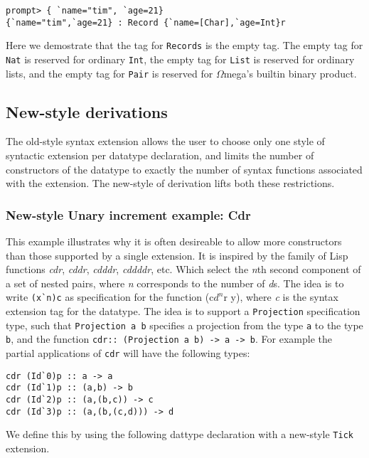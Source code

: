 \documentclass[11pt,twoside]{article}
\newcommand{\om}{$\Omega$mega}
\begin{document}
\begin{verbatim}
prompt> { `name="tim", `age=21}
{`name="tim",`age=21} : Record {`name=[Char],`age=Int}r
\end{verbatim} 

Here we demostrate that the tag for {\tt Records} is the empty tag.
The empty tag for {\tt Nat} is reserved for ordinary {\tt Int},
the empty tag for {\tt List} is reserved for ordinary lists,
and the empty tag for {\tt Pair} is reserved for \om's builtin binary
product.

\subsection{New-style derivations}

The old-style syntax extension allows the user to choose only one style of syntactic extension
per datatype declaration, and limits the number of constructors of the datatype to exactly the number
of syntax functions associated with the extension. The new-style of derivation lifts both these restrictions.

\subsubsection{New-style Unary increment example: Cdr}

This example illustrates why it is often desireable to allow more constructors than those supported by a
single extension. It is inspired by the family of Lisp functions {\it cdr}, {\it cddr}, {\it cdddr}, {\it
cddddr}, etc. Which select the {\it n}th second component of a set of nested pairs, where {\it n}
corresponds to the number of {\it d}s. The idea is to write \verb+(x`n)c+ as specification
for the function (c$d^n$r y), where {\it c}
is the syntax extension tag for the datatype. The idea is to support a {\tt Projection}
specification type, such that {\tt Projection a b} specifies a projection from the type {\tt a}
to the type {\tt b}, and the function {\tt cdr:: (Projection a b) -> a -> b}. For
example the partial applications of {\tt cdr} will have the following types:

\begin{verbatim}
cdr (Id`0)p :: a -> a
cdr (Id`1)p :: (a,b) -> b
cdr (Id`2)p :: (a,(b,c)) -> c
cdr (Id`3)p :: (a,(b,(c,d))) -> d
\end{verbatim}

We define this by using the following dattype declaration with a new-style {\tt Tick}
extension.
\end{document}

